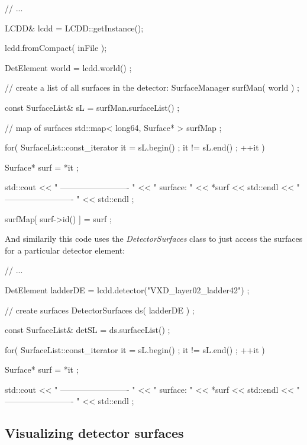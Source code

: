 \documentclass[10pt,a4paper]{article}
\begin{document}
\begin{code}
  // ...

  LCDD& lcdd = LCDD::getInstance();

  lcdd.fromCompact( inFile );

  DetElement world = lcdd.world() ;

  // create a list of all surfaces in the detector:
  SurfaceManager surfMan(  world ) ;

  const SurfaceList& sL = surfMan.surfaceList() ;

  // map of surfaces
  std::map< long64, Surface* > surfMap ;

  for( SurfaceList::const_iterator it = sL.begin() ; it != sL.end() ; ++it ){
    
    Surface* surf =  *it ;
    
    std::cout << " ------------------------- " 
      	      << " surface: "  << *surf         << std::endl
      	      << " ------------------------- "  << std::endl ;
    
    surfMap[ surf->id() ] = surf ;
  }

\end{code}

\noindent
And similarily this code uses the {\em DetectorSurfaces} class to just access the surfaces 
for a particular detector element:

\begin{code}
  // ...

  DetElement ladderDE = lcdd.detector("VXD_layer02_ladder42") ;

  // create surfaces
  DetectorSurfaces ds( ladderDE ) ;

  const SurfaceList& detSL = ds.surfaceList() ;

  for( SurfaceList::const_iterator it = sL.begin() ; it != sL.end() ; ++it ){
    
    Surface* surf =  *it ;
    
    std::cout << " ------------------------- " 
      	      << " surface: "  << *surf         << std::endl
      	      << " ------------------------- "  << std::endl ;
  }
\end{code}

\subsection{Visualizing detector surfaces}
\label{subsec:ddrec-surfaces-visualization}
\end{document}
